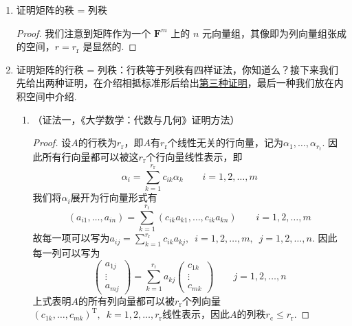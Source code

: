 \begin{enumerate}
    \item 证明矩阵的秩 = 列秩

          \begin{proof}
            我们注意到矩阵作为一个 $\mathbf{F}^m$ 上的 $n$ 元向量组，其像即为列向量组张成的空间，$r = r_{\mathrm{r}}$ 是显然的.

          \end{proof}

    \item 证明矩阵的行秩 = 列秩：行秩等于列秩有四样证法，你知道么？接下来我们先给出两种证明，在介绍相抵标准形后给出\hyperref[pf:11:矩阵行秩=列秩]{第三种证明}，最后一种我们放在内积空间中介绍.
          \begin{enumerate}
              \item （证法一，《大学数学：代数与几何》证明方法）
                    \begin{proof}
                        设$A$的行秩为$r_{\mathrm{r}}$，即$A$有$r_{\mathrm{r}}$个线性无关的行向量，记为$\alpha_1,\ldots,\alpha_{r_{\mathrm{r}}}$. 因此所有行向量都可以被这$r_{\mathrm{r}}$个行向量线性表示，即
                        \[\alpha_i=\sum_{k=1}^{r_{\mathrm{r}}}c_{ik}\alpha_k \qquad i=1,2,\ldots,m\]
                        我们将$\alpha_i$展开为行向量形式有
                        \[(a_{i1},\ldots,a_{in})=\sum_{k=1}^{r_{\mathrm{r}}}(c_{ik}a_{k1},\ldots,c_{ik}a_{kn}) \qquad i=1,2,\ldots,m\]
                        故每一项可以写为$a_{ij}=\displaystyle\sum_{k=1}^{r_{\mathrm{r}}}c_{ik}a_{kj},\enspace i=1,2,\ldots,m,\enspace j=1,2,\ldots,n$. 因此每一列可以写为
                        \[\begin{pmatrix}
                                a_{1j} \\ \vdots \\ a_{mj}
                            \end{pmatrix}=\sum_{k=1}^{r_{\mathrm{r}}}a_{kj}\begin{pmatrix}
                                c_{1k} \\ \vdots \\ c_{mk}
                            \end{pmatrix} \qquad j=1,2,\ldots,n\]
                        上式表明$A$的所有列向量都可以被$r_{\mathrm{r}}$个列向量$(c_{1k},\ldots,c_{mk})^\mathrm{T},\enspace k=1,2,\ldots,r_{\mathrm{r}}$线性表示，因此$A$的列秩$r_{\mathrm{c}}\leqslant r_{\mathrm{r}}$.


\end{proof}
\end{enumerate}
\end{enumerate}
